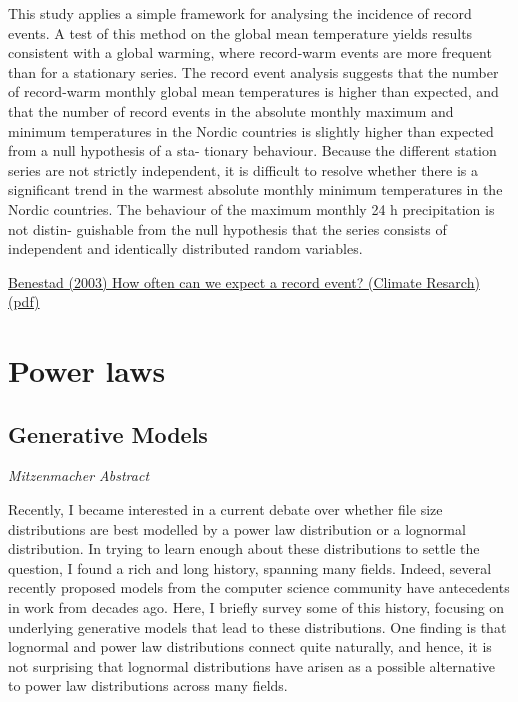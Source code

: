 \documentclass[
]{book}
\begin{document}
This study applies a simple framework for analysing the incidence of record events. A
test of this method on the global mean temperature yields results consistent with a global warming,
where record-warm events are more frequent than for a stationary series. The record event analysis
suggests that the number of record-warm monthly global mean temperatures is higher than
expected, and that the number of record events in the absolute monthly maximum and minimum
temperatures in the Nordic countries is slightly higher than expected from a null hypothesis of a sta-
tionary behaviour. Because the different station series are not strictly independent, it is difficult to
resolve whether there is a significant trend in the warmest absolute monthly minimum temperatures
in the Nordic countries. The behaviour of the maximum monthly 24 h precipitation is not distin-
guishable from the null hypothesis that the series consists of independent and identically distributed
random variables.

\href{pdf/Benestad_2003_How_often_record_event.pdf}{Benestad (2003) How often can we expect a record event? (Climate Resarch) (pdf)}

\hypertarget{power-laws}{%
\chapter{Power laws}\label{power-laws}}

\hypertarget{generative-models}{%
\section{Generative Models}\label{generative-models}}

\emph{Mitzenmacher Abstract}

Recently, I became interested in a current debate over whether file size
distributions are best modelled by a power law distribution or a lognormal distribution.
In trying to learn enough about these distributions to settle the question, I found a rich
and long history, spanning many fields. Indeed, several recently proposed models from
the computer science community have antecedents in work from decades ago. Here,
I briefly survey some of this history, focusing on underlying generative models that
lead to these distributions. One finding is that lognormal and power law distributions
connect quite naturally, and hence, it is not surprising that lognormal distributions
have arisen as a possible alternative to power law distributions across many fields.
\end{document}
